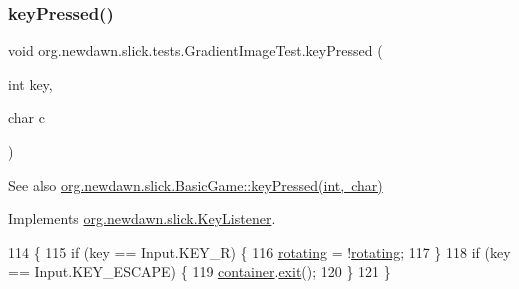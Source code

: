 \mbox{\label{classorg_1_1newdawn_1_1slick_1_1tests_1_1_gradient_image_test_a1d578d84408c38e04a1cae5dbf922c04}} 
\subsubsection{\texorpdfstring{key\+Pressed()}{keyPressed()}}
{\footnotesize\ttfamily void org.\+newdawn.\+slick.\+tests.\+Gradient\+Image\+Test.\+key\+Pressed (\begin{DoxyParamCaption}\item[{int}]{key,  }\item[{char}]{c }\end{DoxyParamCaption})\hspace{0.3cm}{\ttfamily [inline]}}

\begin{DoxySeeAlso}{See also}
\mbox{\hyperlink{classorg_1_1newdawn_1_1slick_1_1_basic_game_a4fbb3345b5abf5ddd54a99466d07f02f}{org.\+newdawn.\+slick.\+Basic\+Game\+::key\+Pressed(int, char)}} 
\end{DoxySeeAlso}


Implements \mbox{\hyperlink{interfaceorg_1_1newdawn_1_1slick_1_1_key_listener_ac0b0568a21ef486c4f51382614c196ef}{org.\+newdawn.\+slick.\+Key\+Listener}}.


\begin{DoxyCode}
114                                             \{
115         \textcolor{keywordflow}{if} (key == Input.KEY\_R) \{
116             \mbox{\hyperlink{classorg_1_1newdawn_1_1slick_1_1tests_1_1_gradient_image_test_a94ae96939e1d695a4571141a25473139}{rotating}} = !\mbox{\hyperlink{classorg_1_1newdawn_1_1slick_1_1tests_1_1_gradient_image_test_a94ae96939e1d695a4571141a25473139}{rotating}};
117         \}
118         \textcolor{keywordflow}{if} (key == Input.KEY\_ESCAPE) \{
119             \mbox{\hyperlink{classorg_1_1newdawn_1_1slick_1_1tests_1_1_gradient_image_test_a33951eefaea77bf372778299a807d06a}{container}}.\mbox{\hyperlink{classorg_1_1newdawn_1_1slick_1_1_game_container_a6d888463695fe3aac4123e72ac14480f}{exit}}();
120         \}
121     \}
\end{DoxyCode}
\mbox{\label{classorg_1_1newdawn_1_1slick_1_1tests_1_1_gradient_image_test_a8cf2005bbbfe5ed0564edd8cc376b977}} 
